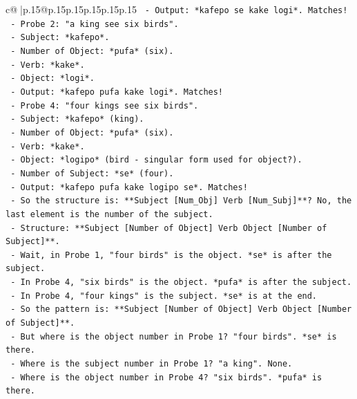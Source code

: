 \documentclass{article}
\begin{document}
{\begin{supertabular}{c@{$\;$}|p{.15\linewidth}@{}p{.15\linewidth}p{.15\linewidth}p{.15\linewidth}p{.15\linewidth}p{.15\linewidth}}
{{{\texttt{          {-} Output: *kafepo se kake logi*. Matches!} \\
\texttt{        {-} Probe 2: "a king see six birds".} \\
\texttt{          {-} Subject: *kafepo*.} \\
\texttt{          {-} Number of Object: *pufa* (six).} \\
\texttt{          {-} Verb: *kake*.} \\
\texttt{          {-} Object: *logi*.} \\
\texttt{          {-} Output: *kafepo pufa kake logi*. Matches!} \\
\texttt{        {-} Probe 4: "four kings see six birds".} \\
\texttt{          {-} Subject: *kafepo* (king).} \\
\texttt{          {-} Number of Object: *pufa* (six).} \\
\texttt{          {-} Verb: *kake*.} \\
\texttt{          {-} Object: *logipo* (bird {-} singular form used for object?).} \\
\texttt{          {-} Number of Subject: *se* (four).} \\
\texttt{          {-} Output: *kafepo pufa kake logipo se*. Matches!} \\
\texttt{        {-} So the structure is: **Subject {[}Num\_Obj{]} Verb {[}Num\_Subj{]}**? No, the last element is the number of the subject.} \\
\texttt{        {-} Structure: **Subject {[}Number of Object{]} Verb Object {[}Number of Subject{]}**.} \\
\texttt{        {-} Wait, in Probe 1, "four birds" is the object. *se* is after the subject.} \\
\texttt{        {-} In Probe 4, "six birds" is the object. *pufa* is after the subject.} \\
\texttt{        {-} In Probe 4, "four kings" is the subject. *se* is at the end.} \\
\texttt{        {-} So the pattern is: **Subject {[}Number of Object{]} Verb Object {[}Number of Subject{]}**.} \\
\texttt{        {-} But where is the object number in Probe 1? "four birds". *se* is there.} \\
\texttt{        {-} Where is the subject number in Probe 1? "a king". None.} \\
\texttt{        {-} Where is the object number in Probe 4? "six birds". *pufa* is there.} \\
}}}
\end{supertabular}}
\end{document}

